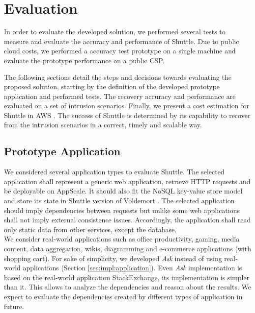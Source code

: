 \chapter{Evaluation}\label{chapter:evaluation}
In order to evaluate the developed solution, we performed several tests to measure and evaluate the accuracy and performance of Shuttle. Due to public cloud costs, we performed a accuracy test prototype on a single machine and evaluate the prototype performance on a public \acf{CSP}.

The following sections detail the steps and decisions towards evaluating the proposed solution, starting by the definition of the developed prototype application and performed tests. The recovery accuracy and performance are evaluated on a set of intrusion scenarios. Finally, we present a cost estimation for Shuttle in \ac{AWS} \cite{aws}. The success of Shuttle is determined by its capability to recover from the intrusion scenarios in a correct, timely and scalable way.


\section{Prototype Application}
 We considered several application types to evaluate Shuttle. The selected application shall represent a generic web application, retrieve \ac{HTTP} requests and be deployable on AppScale. It should also fit the \acs{NoSQL} key-value store model and store its state in Shuttle version of Voldemort \cite{Kreps}. The selected application should imply dependencies between requests but unlike some web applications shall not imply external consistence issues. Accordingly, the application shall read only static data from other services, except the database.\\

We consider real-world applications such as office productivity, gaming, media content, data aggregation, wikis, diagramming and e-commerce applications (with shopping cart). For sake of simplicity, we developed \textit{Ask} instead of using real-world applications (Section \ref{sec:impl:application}). Even \textit{Ask} implementation is based on the real-world application StackExchange, its implementation is simpler than it. This allows to analyze the dependencies and reason about the results. We expect to evaluate the dependencies created by different types of application in future.

